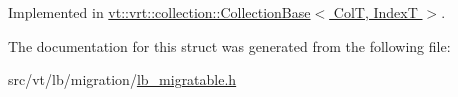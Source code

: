 Implemented in \hyperlink{structvt_1_1vrt_1_1collection_1_1_collection_base_a34f089d6f08e84b1745a265ad865807a}{vt\+::vrt\+::collection\+::\+Collection\+Base$<$ Col\+T, Index\+T $>$}.



The documentation for this struct was generated from the following file\+:\begin{DoxyCompactItemize}
\item 
src/vt/lb/migration/\hyperlink{lb__migratable_8h}{lb\+\_\+migratable.\+h}\end{DoxyCompactItemize}
